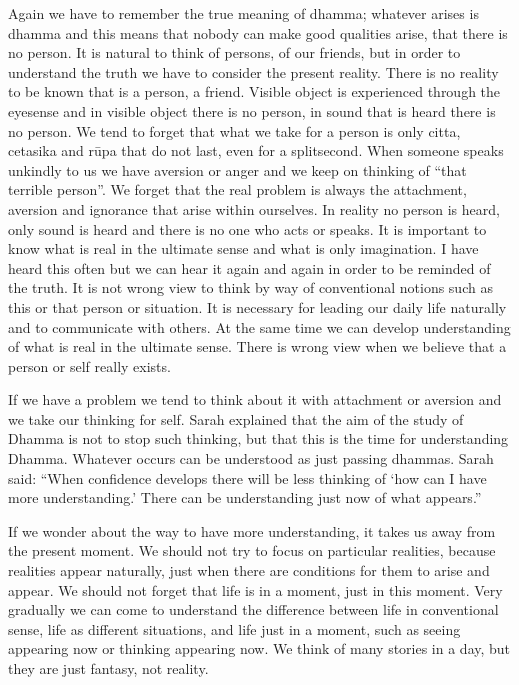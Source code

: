 {Again we have to remember the true meaning of dhamma;
whatever arises is dhamma and this means that nobody can make good
qualities arise, that there is no person. It is natural to think of
persons, of our friends, but in order to understand the truth we have to
consider the present reality. There is no reality to be known that is a
person, a friend. Visible object is experienced through the eyesense and
in visible object there is no person, in sound that is heard there is no
person. We tend to forget that what we take for a person is only citta,
cetasika and rūpa that do not last, even for a splitsecond. When someone
speaks unkindly to us we have aversion or anger and we keep on thinking
of ``that terrible person''. We forget that the real problem is always
the attachment, aversion and ignorance that arise within ourselves. In
reality no person is heard, only sound is heard and there is no one who
acts or speaks. It is important to know what is real in the ultimate
sense and what is only imagination. I have heard this often but we can
hear it again and again in order to be reminded of the truth. It is not
wrong view to think by way of conventional notions such as this or that
person or situation. It is necessary for leading our daily life
naturally and to communicate with others. At the same time we can
develop understanding of what is real in the ultimate sense. There is
wrong view when we believe that a person or self really exists.

If we have a problem we tend to think about it with
attachment or aversion and we take our thinking for self. Sarah
explained that the aim of the study of Dhamma is not to stop such
thinking, but that this is the time for understanding Dhamma. Whatever
occurs can be understood as just passing dhammas. Sarah said: ``When
confidence develops there will be less thinking of `how can I have more
understanding.' There can be understanding just now of what appears.'' 

If we wonder about the way to have more understanding, it
takes us away from the present moment. We should not try to focus on
particular realities, because realities appear naturally, just when
there are conditions for them to arise and appear. We should not forget
that life is in a moment, just in this moment. Very gradually we can
come to understand the difference between life in conventional sense,
life as different situations, and life just in a moment, such as seeing
appearing now or thinking appearing now. We think of many stories in a
day, but they are just fantasy, not reality. 

}
